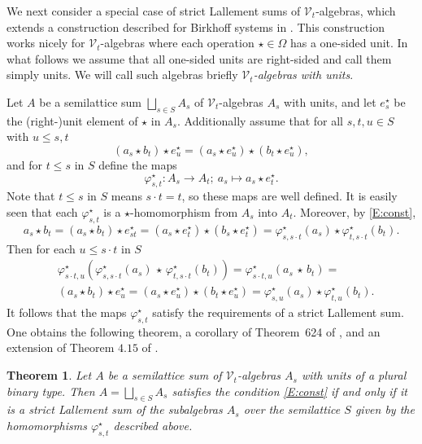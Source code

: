 \documentclass{birkau}
\def\Om{\Omega}
\newcommand{\mcV}{\mathcal{V}}
\theoremstyle{plain}
\newtheorem{theorem}{Theorem}[section]
\theoremstyle{definition}
\numberwithin{equation}{section}
\begin{document}
We next consider a special case of strict Lallement sums of $\mcV_t$-algebras, which
extends a construction described for Birkhoff systems in \cite{HR17b}.  This construction
works nicely for $\mcV_t$-algebras where each operation $\star \in \Om$ has a one-sided
unit. In what follows we assume that all one-sided units are right-sided and call them
simply units. We will call such algebras briefly \emph{$\mcV_t$-algebras with units}.

Let $A$ be a semilattice sum $\bigsqcup_{s\in S} A_s$ of $\mcV_t$-algebras $A_s$ with
units, and let $e_{s}^{\star}$ be the (right-)unit element of $\star$ in
$A_s$. Additionally assume that for all $s, t, u \in S$ with $u \leq s, t$
\begin{equation}\label{E:const}
(a_s \star b_t) \star e_{u}^{\star} = (a_s \star e_{u}^{\star}) \star (b_t \star e_{u}^{\star}),
\end{equation}
and for $t\leq s$ in $S$ define the maps
\begin{equation*}
\varphi_{s,t}^{\star} \colon A_s \rightarrow A_t;\  a_s \mapsto a_s \star e_{t}^{\star}.
\end{equation*}
Note that $t\leq s$ in $S$ means $s\cdot t = t$, so these maps are well
defined. It is easily seen that each $\varphi_{s,t}^{\star}$ is a $\star$-homomorphism
from $A_s$ into $A_t$. Moreover, by \eqref{E:const}, 
\begin{equation*}
a_s \star b_t = (a_s \star b_t) \star e_{st}^{\star} = (a_s \star e_{t}^{\star}) \star (b_s \star e_{t}^{\star}) =
\varphi_{s,s\cdot t}^{\star}(a_s) \star \varphi_{t,s\cdot t}^{\star}(b_t).
\end{equation*}
Then for each $u \leq s\cdot t$ in $S$
\begin{align*}
&\varphi_{s\cdot t,u}^\star (\varphi_{s,s\cdot t}^\star (a_s) \, \star \, \varphi_{t,s\cdot t}^\star (b_t)) =
\varphi_{s\cdot t,u}^\star (a_s \, \star \,  b_t) =\\
 &(a_s \star b_t) \star e_{u}^{\star} = (a_s \star e_{u}^{\star}) \star (b_t \star e_{u}^{\star}) =
\varphi_{s,u}^\star(a_s) \star \varphi_{t,u}^\star(b_t).
\end{align*}
It follows that the maps $\varphi_{s,t}^{\star}$ satisfy the requirements of a strict
Lallement sum.  One obtains the following theorem, a corollary of Theorem~624 of
\cite{RS85}, and an extension of Theorem $4.15$ of \cite{HR17b}.

\begin{theorem}\label{T:LS}
  Let $A$ be a semilattice sum of $\mcV_t$-algebras $A_s$ with units of a plural binary
  type. Then $A = \bigsqcup_{s \in S} A_s$ satisfies the condition \eqref{E:const} if and
  only if it is a strict Lallement sum of the subalgebras $A_s$ over the semilattice $S$
  given by the homomorphisms $\varphi_{s,t}^{\star}$ described above.
\end{theorem}
\end{document}
